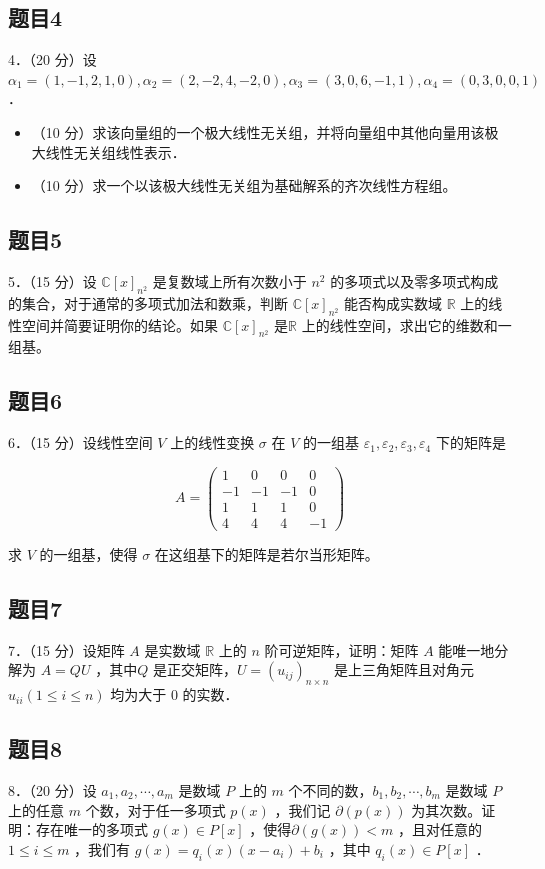 \documentclass{article}
\begin{document}
\subsection{题目4}
4．（20 分）设 \(\alpha_{1}=(1,-1,2,1,0), \alpha_{2}=(2,-2,4,-2,0), \alpha_{3}=(3,0,6,-1,1), \alpha_{4}=(0,3,0,0,1)\) ．

\begin{itemize}
  \item[（1）] （10 分）求该向量组的一个极大线性无关组，并将向量组中其他向量用该极大线性无关组线性表示．
  \item[（2）] （10 分）求一个以该极大线性无关组为基础解系的齐次线性方程组。
\end{itemize}

\subsection{题目5}
5．（15 分）设 \(\mathbb{C}[x]_{n^{2}}\) 是复数域上所有次数小于 \(n^{2}\) 的多项式以及零多项式构成的集合，对于通常的多项式加法和数乘，判断 \(\mathbb{C}[x]_{n^{2}}\) 能否构成实数域 \(\mathbb{R}\) 上的线性空间并简要证明你的结论。如果 \(\mathbb{C}[x]_{n^{2}}\) 是\(\mathbb{R}\) 上的线性空间，求出它的维数和一组基。

\subsection{题目6}
6．（15 分）设线性空间 \(V\) 上的线性变换 \(\sigma\) 在 \(V\) 的一组基 \(\varepsilon_{1}, \varepsilon_{2}, \varepsilon_{3}, \varepsilon_{4}\) 下的矩阵是

\[
A=\left(\begin{array}{cccc}
1 & 0 & 0 & 0 \\
-1 & -1 & -1 & 0 \\
1 & 1 & 1 & 0 \\
4 & 4 & 4 & -1
\end{array}\right)
\]

求 \(V\) 的一组基，使得 \(\sigma\) 在这组基下的矩阵是若尔当形矩阵。

\subsection{题目7}
7．（15 分）设矩阵 \(A\) 是实数域 \(\mathbb{R}\) 上的 \(n\) 阶可逆矩阵，证明：矩阵 \(A\) 能唯一地分解为 \(A=Q U\) ，其中\(Q\) 是正交矩阵，\(U=\left(u_{i j}\right)_{n \times n}\) 是上三角矩阵且对角元 \(u_{i i}(1 \leq i \leq n)\) 均为大于 0 的实数．

\subsection{题目8}
8．（20 分）设 \(a_{1}, a_{2}, \cdots, a_{m}\) 是数域 \(P\) 上的 \(m\) 个不同的数，\(b_{1}, b_{2}, \cdots, b_{m}\) 是数域 \(P\) 上的任意 \(m\) 个数，对于任一多项式 \(p(x)\) ，我们记 \(\partial(p(x))\) 为其次数。证明：存在唯一的多项式 \(g(x) \in P[x]\) ，使得\(\partial(g(x))<m\) ，且对任意的 \(1 \leq i \leq m\) ，我们有 \(g(x)=q_{i}(x)\left(x-a_{i}\right)+b_{i}\) ，其中 \(q_{i}(x) \in P[x]\) ．
\end{document}
